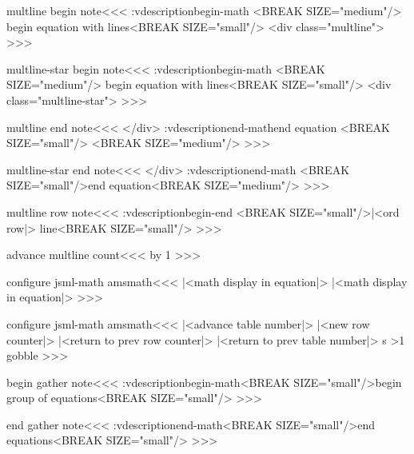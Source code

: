 {\<multline begin note\><<<
\add:vdescription{begin-math}{%
   <BREAK SIZE="medium"/>%
   begin equation 
   with
   lines<BREAK SIZE="small"/>}%
<div class="multline">%
>>>

\<multline-star begin note\><<<
\add:vdescription{begin-math}{%
   <BREAK SIZE="medium"/>%
   begin equation with
   lines<BREAK SIZE="small"/>}%
<div class="multline-star">%
>>>


\<multline end note\><<<
</div>%
\add:vdescription{end-math}{end equation
   <BREAK SIZE="small"/>%
   <BREAK SIZE="medium"/>%
}%
>>>          

\<multline-star end note\><<<
</div>%
\add:vdescription{end-math}{%
   <BREAK SIZE="small"/>end equation<BREAK SIZE="medium"/>}%
>>>          


\<multline row note\><<<
\add:vdescription{begin-end}{%
   <BREAK SIZE="small"/>|<ord row|> line<BREAK SIZE="small"/>}%
>>>

\<advance multline count\><<<
\HAdvance\HRow by 1
>>>




\<configure jsml-math amsmath\><<<
   {\bgroup |<math display in equation|>}
   {\egroup}
   {}{}  
   {\bgroup |<math display in equation|>}
   {\egroup}
   {}{}  
>>>



\<configure jsml-math amsmath\><<<
   {|<advance table number|>%
    |<new row counter|>%
    }
   {%
    |<return to prev row counter|>%
    |<return to prev table number|>}
   {}
   {\xdef\hrow:s{\HRow}} 
   {%
    \ifnum \HCol>1 \let\tagform@\:gobble \fi
   } 
   {}
>>>

\<begin gather note\><<<
\add:vdescription{begin-math}{<BREAK SIZE="small"/>begin group of
    equations<BREAK SIZE="small"/>}%
>>>

\<end gather note\><<<
\add:vdescription{end-math}{<BREAK SIZE="small"/>end equations<BREAK SIZE="small"/>}%
>>>

}
